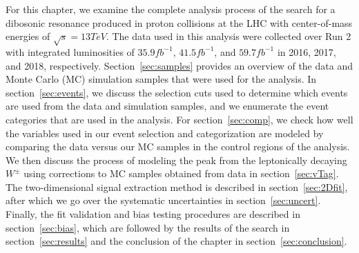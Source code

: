 For this chapter, we examine the complete analysis process of the search for a dibosonic resonance produced in proton collisions at the LHC with center-of-mass energies of $\sqrt{s}=13\unit{TeV}$.
The data used in this analysis were collected over Run 2 with integrated luminosities of $35.9\unit{fb^{-1}}$, $41.5\unit{fb^{-1}}$, and $59.7\unit{fb^{-1}}$ in 2016, 2017, and 2018, respectively.
Section~\ref{sec:samples} provides an overview of the data and Monte Carlo (MC) simulation samples that were used for the analysis.
In section~\ref{sec:events}, we discuss the selection cuts used to determine which events are used from the data and simulation samples, and we enumerate the event categories that are used in the analysis.
For section~\ref{sec:comp}, we check how well the variables used in our event selection and categorization are modeled by comparing the data versus our MC samples in the control regions of the analysis.
We then discuss the process of modeling the peak from the leptonically decaying $W^\pm$ using corrections to MC samples obtained from data in section~\ref{sec:vTag}.
The two-dimensional signal extraction method is described in section~\ref{sec:2Dfit}, after which we go over the systematic uncertainties in section~\ref{sec:uncert}.
Finally, the fit validation and bias testing procedures are described in section~\ref{sec:bias}, which are followed by the results of the search in section~\ref{sec:results} and the conclusion of the chapter in section~\ref{sec:conclusion}.
